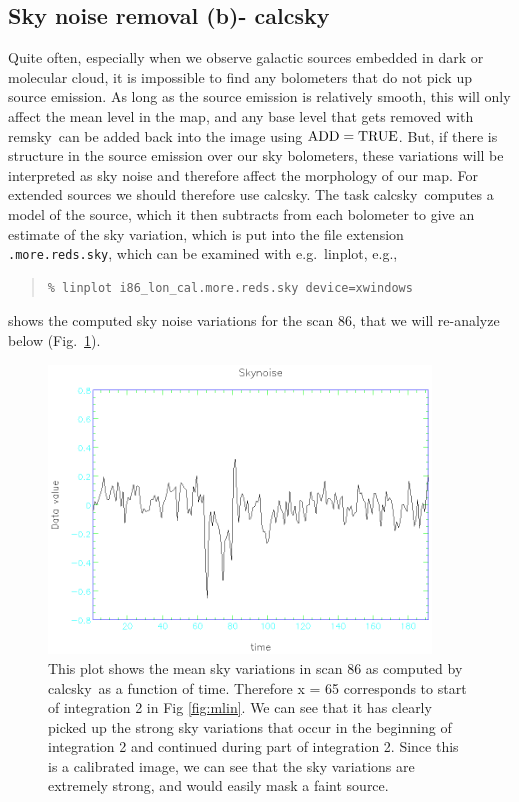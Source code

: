 \documentclass[twoside,11pt]{article}
\newenvironment{myquote}{\begin{quote}\begin{small}}{\end{small}\end{quote}}
\newcommand{\task}[1]{\textsf{#1}}
\newcommand{\calcsky}{\xref{\task{calcsky}}{sun216}{CALCSKY}}
\newcommand{\remsky}{\xref{\task{remsky}}{sun216}{REMSKY}}
\newcommand{\linplot}{\xref{\task{linplot}}{sun95}{LINPLOT}}
\newcommand{\xref}[3]{#1}
\newcommand{\xlabel}[1]{}
\renewcommand{\_}{\texttt{\symbol{95}}}
\begin{document}
\subsection{\xlabel{Sky_Noise_Removal_calcsky}Sky noise removal (b)- 
\calcsky \label{Sky_Noise_Removal_calcsky}}

Quite often, especially when we observe galactic sources embedded in
dark or molecular cloud, it is impossible to find any bolometers that
do not pick up source emission.  As long as the source emission is
relatively smooth, this will only affect the mean level in the map,
and any base level that gets removed with \remsky\ can be added back
into the image using $\rm ADD=TRUE$.  But, if there is structure in
the source emission over our sky bolometers, these variations will be
interpreted as sky noise and therefore affect the morphology of our
map.  For extended sources we should therefore use \calcsky.  The task
\calcsky\ computes a model of the source, which it then subtracts from
each bolometer to give an estimate of the sky variation, which is put
into the file extension \texttt{.more.reds.sky}, which can be examined
with e.g.\ \linplot, e.g.,


\begin{myquote}
\begin{verbatim}
% linplot i86_lon_cal.more.reds.sky device=xwindows 
\end{verbatim}
\end{myquote}

shows the computed sky noise variations for the scan 86, that we will
re-analyze below (Fig.\ \ref{fig:sky}).


\begin{figure}
\begin{center}
\includegraphics[width=4.0in]{sc11_fig5.eps}
\caption{This plot shows the mean sky variations in scan 86 as computed
by \calcsky\ as a function of time.  Therefore x = 65 corresponds to
start of integration 2 in Fig \ref{fig:mlin}. We can see that it has
clearly picked up the strong sky variations that occur in the beginning
of integration 2 and continued during part of integration 2.  Since
this is a calibrated image, we can see that the sky variations are
extremely strong, and would easily mask a faint source.}


\label{fig:sky}
\end{center}
\end{figure}
\end{document}
